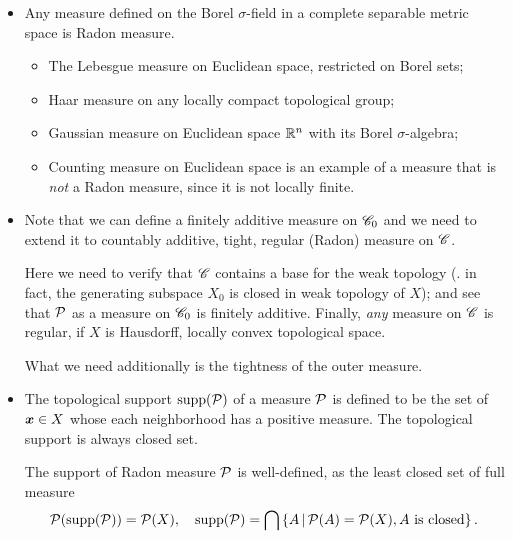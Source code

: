 \documentclass[11pt]{article}
\begin{document}
\begin{itemize}
\item Any measure defined on the Borel $\sigma$-field in a complete separable metric space is Radon measure. 
\begin{itemize}
\item The Lebesgue measure on Euclidean space, restricted on Borel sets;
\item Haar measure on any locally compact topological group;
\item Gaussian measure on Euclidean space ${\mathbb R}^n$ with its Borel $\sigma$-algebra;
\item Counting measure on Euclidean space is an example of a measure that is \emph{not} a Radon measure, since it is not locally finite.
\end{itemize} 
 
\item Note that we can define a finitely additive measure on ${\mathscr C}_{0}$ and we need to extend it to countably additive, tight, regular (Radon) measure on ${\mathscr C}$.  

Here we need to verify that ${\mathscr C}$ contains a base for the weak topology (. in fact, the generating subspace $X_{0}$ is closed in weak topology of $X$); and see that ${\mathcal P}$ as a measure on ${\mathscr C}_{0}$ is finitely additive. Finally, \emph{any} measure on ${\mathscr C}$ is regular, if $X$ is Hausdorff, locally convex topological space. 

What we need additionally is the tightness of the outer measure. 

\item The topological support $\text{supp}({\mathcal P})$ of a measure ${\mathcal P}$ is defined to be the set of $\boldsymbol{x}\in X$ whose each neighborhood has a positive measure. The topological support is always closed set. 

The support of Radon measure ${\mathcal P}$ is well-defined, as the least closed set of full measure
\begin{align*}
{\mathcal P}(\text{supp}({\mathcal P})) = {\mathcal P}(X), \quad  \text{supp}({\mathcal P})= \bigcap\left\{A\,|\, {\mathcal P}(A) = {\mathcal P}(X), A\text{ is closed}\right\}.
\end{align*} 

\end{itemize}
\end{document}
